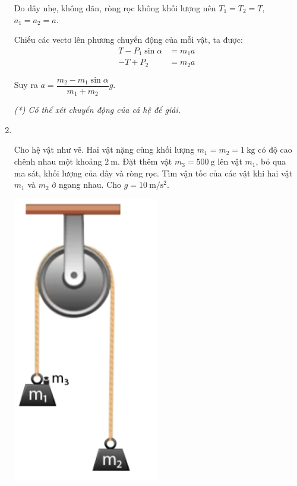 \begin{enumerate}[label=\bfseries Bài \arabic*:,leftmargin=1.5cm]
{	Do dây nhẹ, không dãn, ròng rọc không khối lượng nên $T_1 = T_2 = T$, $a_1 = a_2 = a$.
	
	Chiếu các vectơ lên phương chuyển động của mỗi vật, ta được:
	\begin{align*}
		T - P_1 \sin \alpha &= m_1 a \\
		-T + P_2 &= m_2 a
	\end{align*}
	
	Suy ra $a=\dfrac{m_2 - m_1 \sin \alpha}{m_1 + m_2}g$.
	
	\textit{(*) Có thể xét chuyển động của cả hệ để giải.}
}

\item{}\\
{\begin{minipage}[l]{0.7\textwidth}
		Cho hệ vật như vẽ. Hai vật nặng cùng khối lượng $m_1=m_2=\SI{1}{\kilogram}$ có độ cao chênh nhau một khoảng $\SI{2}{\meter}$. Đặt thêm vật $m_3=\SI{500}{\gram}$ lên vật $m_1$, bỏ qua ma sát, khối lượng của dây và ròng rọc. Tìm vận tốc của các vật khi hai vật $m_1$ và $m_2$ ở ngang nhau. Cho $g=\SI{10}{\meter/\second^2}$.
	\end{minipage}
	\begin{minipage}{0.3\textwidth}
		\begin{center}
			\includegraphics[width=0.3\linewidth]{../figs/VN10-2022-PH-TP021-P-1}
		\end{center}
	\end{minipage}
}
\end{enumerate}
